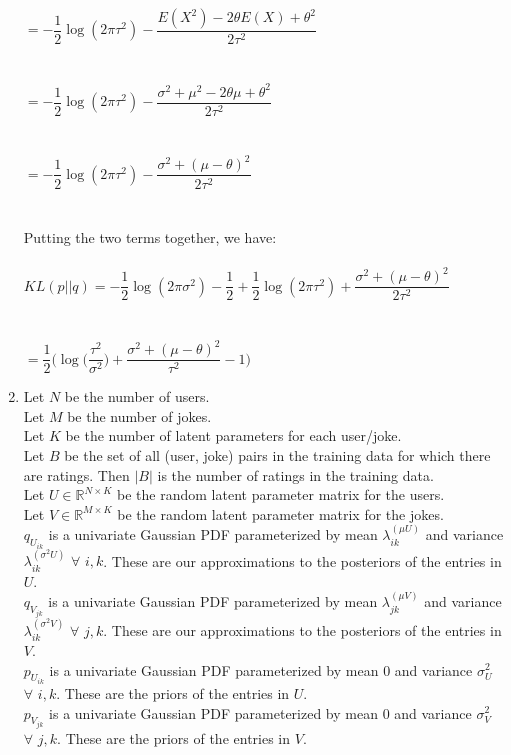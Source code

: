 \documentclass[submit]{harvardml}
\newcommand{\R}{\mathbb{R}}
\theoremstyle{plain}
\begin{document}
\begin{enumerate}[label=2.\arabic*.]
$=-\dfrac{1}{2}\log(2\pi\tau^2)-\dfrac{E(X^2)-2\theta E(X)+\theta^2}{2\tau^2}$\\\\\\
$=-\dfrac{1}{2}\log(2\pi\tau^2)-\dfrac{\sigma^2+\mu^2-2\theta\mu+\theta^2}{2\tau^2}$\\\\\\
$=-\dfrac{1}{2}\log(2\pi\tau^2)-\dfrac{\sigma^2+(\mu-\theta)^2}{2\tau^2}$\\\\\\
Putting the two terms together, we have:\\\\
$KL(p||q)=-\dfrac{1}{2}\log(2\pi\sigma^2)-\dfrac{1}{2}+\dfrac{1}{2}\log(2\pi\tau^2)+\dfrac{\sigma^2+(\mu-\theta)^2}{2\tau^2}$\\\\\\
$=\dfrac{1}{2}\Bigg(\log\bigg(\dfrac{\tau^2}{\sigma^2}\bigg)+\dfrac{\sigma^2+(\mu-\theta)^2}{\tau^2}-1\Bigg)$
\item Let $N$ be the number of users.\\
Let $M$ be the number of jokes.\\
Let $K$ be the number of latent parameters for each user/joke.\\
Let $B$ be the set of all (user, joke) pairs in the training data for which there are ratings. Then $|B|$ is the number of ratings in the training data.\\
Let $U\in\R^{N\times K}$ be the random latent parameter matrix for the users.\\
Let $V\in\R^{M\times K}$ be the random latent parameter matrix for the jokes.\\
$q_{U_{ik}}$ is a univariate Gaussian PDF parameterized by mean $\lambda_{ik}^{(\mu U)}$ and variance $\lambda_{ik}^{(\sigma^2U)}$ $\forall$ $i,k$. These are our approximations to the posteriors of the entries in $U$.\\
$q_{V_{jk}}$ is a univariate Gaussian PDF parameterized by mean $\lambda_{jk}^{(\mu V)}$ and variance $\lambda_{ik}^{(\sigma^2V)}$ $\forall$ $j,k$. These are our approximations to the posteriors of the entries in $V$.\\
$p_{U_{ik}}$ is a univariate Gaussian PDF parameterized by mean $0$ and variance $\sigma_U^2$ $\forall$ $i,k$. These are the priors of the entries in $U$.\\
$p_{V_{jk}}$ is a univariate Gaussian PDF parameterized by mean $0$ and variance $\sigma_V^2$ $\forall$ $j,k$. These are the priors of the entries in $V$.\\\\

\end{enumerate}
\end{document}
